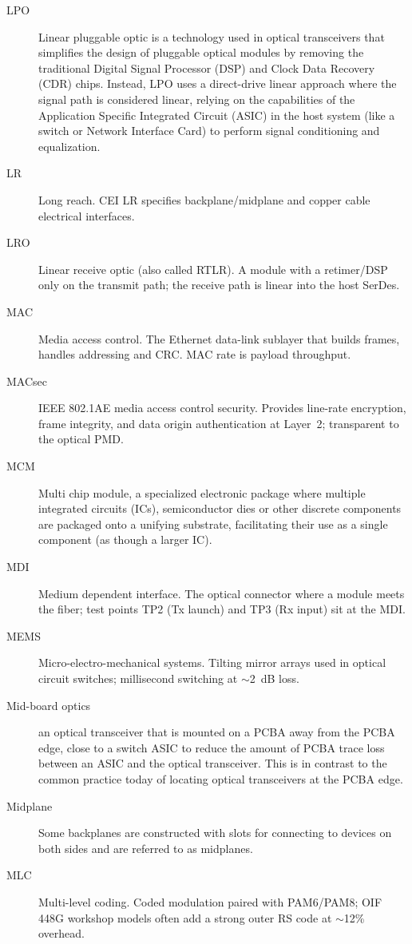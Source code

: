 \begin{description}
\item[LPO] Linear pluggable optic is a technology used in optical transceivers that simplifies the design of pluggable optical modules by removing the traditional Digital Signal Processor (DSP) and Clock Data Recovery (CDR) chips. Instead, LPO uses a direct-drive linear approach where the signal path is considered linear, relying on the capabilities of the Application Specific Integrated Circuit (ASIC) in the host system (like a switch or Network Interface Card) to perform signal conditioning and equalization.
\item[LR] Long reach. CEI LR specifies backplane/midplane and copper cable electrical interfaces.
\item[LRO] Linear receive optic (also called RTLR). A module with a retimer/DSP only on the transmit path; the receive path is linear into the host SerDes.
\item[MAC] Media access control. The Ethernet data-link sublayer that builds frames, handles addressing and CRC. MAC rate is payload throughput.
\item[MACsec] IEEE 802.1AE media access control security. Provides line-rate encryption, frame integrity, and data origin authentication at Layer~2; transparent to the optical PMD.
\item[MCM] Multi chip module, a specialized electronic package where multiple integrated circuits (ICs), semiconductor dies or other discrete components are packaged onto a unifying substrate, facilitating their use as a single component (as though a larger IC).
\item[MDI] Medium dependent interface. The optical connector where a module meets the fiber; test points TP2 (Tx launch) and TP3 (Rx input) sit at the MDI.
\item[MEMS] Micro-electro-mechanical systems. Tilting mirror arrays used in optical circuit switches; millisecond switching at $\sim$2~dB loss.
\item[Mid-board optics] an optical transceiver that is mounted on a PCBA away from the PCBA edge, close to a switch ASIC to reduce the amount of PCBA trace loss between an ASIC and the optical transceiver. This is in contrast to the common practice today of locating optical transceivers at the PCBA edge.
\item[Midplane] Some backplanes are constructed with slots for connecting to devices on both sides and are referred to as midplanes.
\item[MLC] Multi-level coding. Coded modulation paired with PAM6/PAM8; OIF 448G workshop models often add a strong outer RS code at $\sim$12\% overhead.

\end{description}
